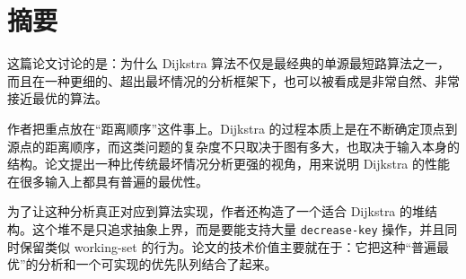\documentclass[UTF8]{ctexart}
\begin{document}
\section*{摘要}
这篇论文讨论的是：为什么 Dijkstra 算法不仅是最经典的单源最短路算法之一，而且在一种更细的、超出最坏情况的分析框架下，也可以被看成是非常自然、非常接近最优的算法。

作者把重点放在“距离顺序”这件事上。Dijkstra 的过程本质上是在不断确定顶点到源点的距离顺序，而这类问题的复杂度不只取决于图有多大，也取决于输入本身的结构。论文提出一种比传统最坏情况分析更强的视角，用来说明 Dijkstra 的性能在很多输入上都具有普遍的最优性。

为了让这种分析真正对应到算法实现，作者还构造了一个适合 Dijkstra 的堆结构。这个堆不是只追求抽象上界，而是要能支持大量 \texttt{decrease-key} 操作，并且同时保留类似 working-set 的行为。论文的技术价值主要就在于：它把这种“普遍最优”的分析和一个可实现的优先队列结合了起来。
\end{document}
